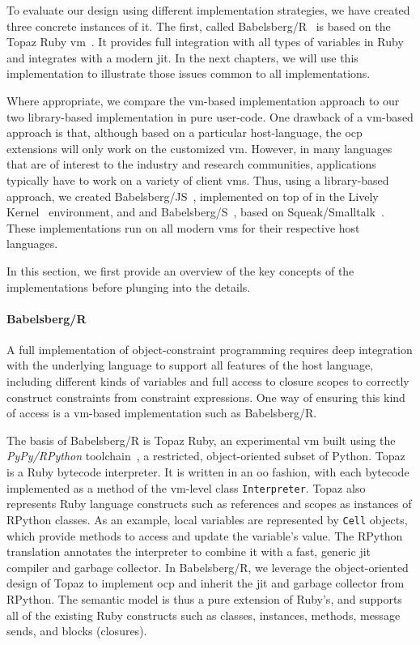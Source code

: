 To evaluate our design using different implementation strategies, we have
created three concrete instances of it. The first, called
Babelsberg/R~\cite{FelgentreffJOT14} is based on the Topaz Ruby
\ac{vm}~\cite{FelgentreffTopazWroclove2013,Seaton:2014:DFS:2617548.2617550,FelgentreffDLS2015}. It
provides full integration with all types of variables in Ruby and integrates
with a modern \ac{jit}. In the next chapters, we will use this implementation to
illustrate those issues common to all implementations.

Where appropriate, we compare the \ac{vm}-based implementation approach to our
two library-based implementation in pure user-code. One drawback of a
\ac{vm}-based approach is that, although based on a particular host-language,
the \ac{ocp} extensions will only work on the customized \ac{vm}. However, in
many languages that are of interest to the industry and research communities,
applications typically have to work on a variety of client \acp{vm}. Thus, using
a library-based approach, we created Babelsberg/JS~\cite{FelgentreffECOOP14},
implemented on top of \javascript in the Lively Kernel~\cite{lively-kernel-2008}
environment, and and Babelsberg/S~\cite{GraberREBLS2014}, based on
Squeak/Smalltalk~\cite{Ingalls1997Squeak}. These implementations run on all
modern \acp{vm} for their respective host languages.

In this section, we first provide an overview of the key concepts of the
implementations before plunging into the details.

\paragraph{Babelsberg/R}
A full implementation of object-constraint programming requires deep integration
with the underlying language to support all features of the host language,
including different kinds of variables and full access to closure scopes to
correctly construct constraints from constraint expressions. One way of ensuring
this kind of access is a \ac{vm}-based implementation such as Babelsberg/R. 

The basis of Babelsberg/R is Topaz Ruby, an experimental \ac{vm} built using the
\emph{PyPy/RPython} toolchain~\cite{rigo2006pypy}, a restricted, object-oriented
subset of Python. Topaz is a Ruby bytecode interpreter. It is written in an
\acrlong{oo} fashion, with each bytecode implemented as a method of the
\ac{vm}-level class \lstinline{Interpreter}. Topaz also represents Ruby language
constructs such as references and scopes as instances of RPython classes. As an
example, local variables are represented by \lstinline{Cell} objects, which
provide methods to access and update the variable's value. The RPython
translation annotates the interpreter to combine it with a fast, generic
\ac{jit} compiler and garbage collector. In Babelsberg/R, we leverage the
object-oriented design of Topaz to implement \ac{ocp} and inherit the \ac{jit}
and garbage collector from RPython. The semantic model is thus a pure extension
of Ruby's, and supports all of the existing Ruby constructs such as classes,
instances, methods, message sends, and blocks (closures).

